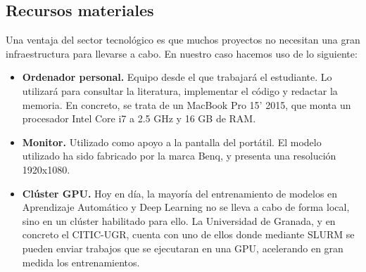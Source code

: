 \subsection{Recursos materiales}

Una ventaja del sector tecnológico es que muchos proyectos no necesitan una gran infraestructura para llevarse a cabo. En nuestro caso hacemos uso de lo siguiente:
\begin{itemize}
    \item \textbf{Ordenador personal.} Equipo desde el que trabajará el estudiante. Lo utilizará para consultar la literatura, implementar el código y redactar la memoria. En concreto, se trata de un MacBook Pro 15' 2015, que monta un procesador Intel Core i7 a 2.5 GHz y 16 GB de RAM.
    \item \textbf{Monitor.} Utilizado como apoyo a la pantalla del portátil. El modelo utilizado ha sido fabricado por la marca Benq, y presenta una resolución 1920x1080.
    \item \textbf{Clúster GPU.} Hoy en día, la mayoría del entrenamiento de modelos en Aprendizaje Automático y Deep Learning no se lleva a cabo de forma local, sino en un clúster habilitado para ello. La Universidad de Granada, y en concreto el CITIC-UGR, cuenta con uno de ellos donde mediante SLURM se pueden enviar trabajos que se ejecutaran en una GPU, acelerando en gran medida los entrenamientos.
\end{itemize}

